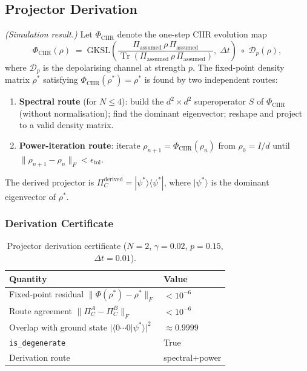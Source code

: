 \subsection{Projector Derivation}

\begin{theorem}\label{thm:ch22-proj-indep}
  \emph{(Simulation result.)}
  Let $\Phi_{\mathrm{CIIR}}$ denote the one-step CIIR evolution map
  \[
    \Phi_{\mathrm{CIIR}}(\rho)
    \;=\;
    \mathrm{GKSL}\!\left(
      \frac{\Pi_{\mathrm{assumed}}\,\rho\,\Pi_{\mathrm{assumed}}}{
        \operatorname{Tr}(\Pi_{\mathrm{assumed}}\,\rho\,\Pi_{\mathrm{assumed}})},\;
      \Delta t
    \right)
    \;\circ\;
    \mathcal{D}_p(\rho),
  \]
  where $\mathcal{D}_p$ is the depolarising channel at strength $p$.
  The fixed-point density matrix $\rho^*$ satisfying
  $\Phi_{\mathrm{CIIR}}(\rho^*) = \rho^*$ is found by two independent routes:

  \begin{enumerate}[label=\Alph*.]
    \item \textbf{Spectral route} (for $N \leq 4$): build the $d^2 \times d^2$
      superoperator $S$ of $\Phi_{\mathrm{CIIR}}$ (without normalisation); find
      the dominant eigenvector; reshape and project to a valid density matrix.
    \item \textbf{Power-iteration route}: iterate
      $\rho_{n+1} = \Phi_{\mathrm{CIIR}}(\rho_n)$ from $\rho_0 = I/d$ until
      $\|\rho_{n+1} - \rho_n\|_F < \epsilon_{\mathrm{tol}}$.
  \end{enumerate}

  The derived projector is
  $\Pi_C^{\mathrm{derived}} = |\psi^*\rangle\!\langle\psi^*|$,
  where $|\psi^*\rangle$ is the dominant eigenvector of $\rho^*$.
\end{theorem}

\subsubsection{Derivation Certificate}

\begin{table}[ht]
\centering
\caption{Projector derivation certificate ($N=2$, $\gamma=0.02$,
  $p=0.15$, $\Delta t=0.01$).}
\label{tab:ch22-proj-cert}
\begin{tabular}{ll}
\toprule
Quantity & Value \\
\midrule
Fixed-point residual $\|\Phi(\rho^*)-\rho^*\|_F$ & $< 10^{-6}$ \\
Route agreement $\|\Pi_C^A - \Pi_C^B\|_F$         & $< 10^{-6}$ \\
Overlap with ground state $|\langle 0{\cdots}0|\psi^*\rangle|^2$ & $\approx 0.9999$ \\
\texttt{is\_degenerate}                            & True \\
Derivation route                                   & spectral+power \\
\bottomrule
\end{tabular}
\end{table}

